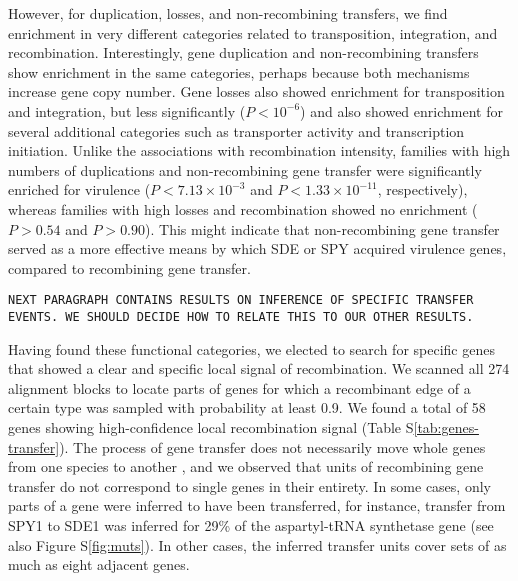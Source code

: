 \documentclass[english]{article}
\begin{document}
However, for duplication, losses, and non-recombining
transfers, we find enrichment in very different categories related to
transposition, integration, and recombination.  Interestingly, gene
duplication and non-recombining transfers show enrichment in the same
categories, perhaps because both mechanisms increase gene copy number.
Gene losses also showed enrichment for transposition and integration,
but less significantly ($P<10^{-6}$) and also showed enrichment for
several additional categories such as transporter activity and
transcription initiation.  Unlike the associations with recombination
intensity, families with high numbers of duplications and
non-recombining gene transfer were significantly enriched for
virulence ($P<7.13 \times 10^{-3}$ and $P<1.33 \times 10^{-11}$,
respectively), whereas families with high losses and recombination
showed no enrichment ($P>0.54$ and $P>0.90$).  This might indicate
that non-recombining gene transfer served as a more effective means by
which SDE or SPY acquired virulence genes, compared to recombining
gene transfer.

\texttt{NEXT PARAGRAPH CONTAINS RESULTS ON INFERENCE OF SPECIFIC TRANSFER 
EVENTS. WE SHOULD DECIDE HOW TO RELATE THIS TO OUR OTHER RESULTS.}

Having found these functional categories, we elected to search for specific 
genes that showed a clear and specific local signal of recombination.  We scanned 
all 274 alignment blocks to locate parts of genes for which a recombinant edge 
of a certain type was sampled with probability at least 0.9. 
We found a total of 58 genes showing high-confidence local 
recombination signal (Table S\ref{tab:genes-transfer}). The process of gene 
transfer does not necessarily move whole genes from one species to another 
\citep[e.g.,][]{Chan2009}, and we observed that units of 
recombining gene transfer do 
not correspond to single genes in their entirety. In some cases, only parts of 
a gene were inferred to have been transferred, for instance, transfer from SPY1 
to SDE1 was inferred for 29\% of the aspartyl-tRNA synthetase gene (see also 
Figure S\ref{fig:muts}). In other cases, the inferred transfer units cover sets 
of as much as eight adjacent genes.

\end{document}
